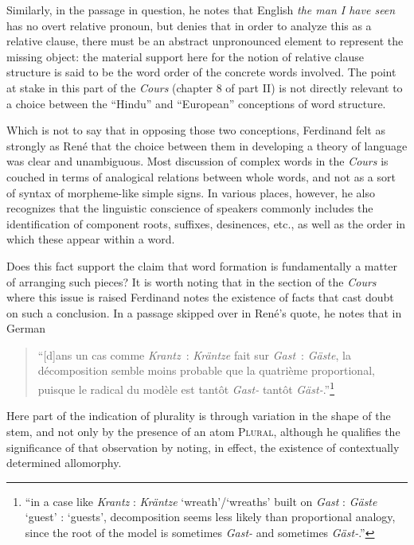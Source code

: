 \documentclass[output=paper]{langsci/langscibook}
\begin{document}
Similarly, in the passage in question, he notes that English
\emph{the man I have seen} has no overt relative pronoun, but
denies that in order to analyze this as a relative clause, there must
be an abstract unpronounced element to represent the missing object:
the material support here for the notion of relative clause structure
is said to be the word order of the concrete words involved. The point
at stake in this part of the \textsl{Cours} (chapter 8 of part II) is
not directly relevant to a choice between the ``Hindu'' and
``European'' conceptions of word structure.

Which is not to say that in opposing those two conceptions, Ferdinand
felt as strongly as Ren\'e that the choice between them in developing
a theory of language was clear and unambiguous. Most discussion of
complex words in the \textsl{Cours} is couched in terms of analogical
relations between whole words, and not as a sort of syntax of
morpheme-like simple signs. In various places, however, he also
recognizes that the linguistic conscience of speakers commonly
includes the identification of component roots, suffixes, desinences,
etc., as well as the order in which these appear within a word. 

Does this fact support the claim that word formation is fundamentally
a matter of arranging such pieces? It is worth noting that in the
section of the \textsl{Cours} where this issue is raised
\citep[228--230]{saussure:cours} Ferdinand notes the existence of
facts that cast doubt on such a conclusion. In a passage skipped over
in Ren\'e's quote, he notes that in German

\begin{quotation}
  ``[d]ans un cas comme \emph{Krantz}~: \emph{Kr\"antze} fait sur
  \emph{Gast}~: \emph{G\"aste}, la décomposition semble moins probable
  que la quatrième proportional, puisque le radical du modèle est
  tantôt \emph{Gast-} tantôt \emph{Gäst-}.''\footnote{``in a case like \emph{Krantz}
    : \emph{Kräntze} `wreath'/`wreaths' built on \emph{Gast} :
    \emph{Gäste} `guest' : `guests', decomposition seems less likely
    than proportional analogy, since the root of the model is
    sometimes \emph{Gast-} and sometimes \emph{Gäst-}.''}
\end{quotation}
Here part of the indication of plurality is through variation in the
shape of the stem, and not only by the presence of an atom
\textsc{Plural}, although he qualifies the significance of that
observation by noting, in effect, the existence of contextually
determined allomorphy.
\end{document}
